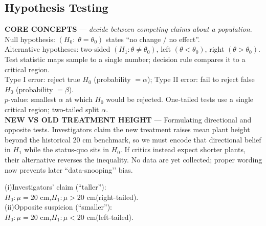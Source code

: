 \documentclass[landscape,0.4pt]{article}
\begin{document}
\begin{multicols*}{6}
\section*{\small{Hypothesis Testing}}

\textbf{\tiny{CORE CONCEPTS}} — \textit{decide between competing claims about a population}.\\
Null hypothesis: $(H_{0}:\;\theta=\theta_{0})$ states “no change / no effect”.\\
Alternative hypotheses: two-sided $(H_{1}:\theta\neq\theta_{0})$, left $(\theta<\theta_{0})$, right $(\theta>\theta_{0})$.\\
Test statistic maps sample to a single number; decision rule compares it to a critical region.\\
Type I error: reject true $H_{0}$ (probability $=\alpha$); Type II error: fail to reject false $H_{0}$ (probability $=\beta$).\\
$p$-value: smallest $\alpha$ at which $H_{0}$ would be rejected.  One-tailed tests use a single critical region; two-tailed split $\alpha$.\\[-2pt]


\textbf{\tiny{NEW VS OLD TREATMENT HEIGHT}} — Formulating directional and opposite tests.  
Investigators claim the new treatment raises mean plant height beyond the historical 20 cm benchmark, so we must encode that directional belief in $H_{1}$ while the status-quo sits in $H_{0}$.  If critics instead expect shorter plants, their alternative reverses the inequality.  No data are yet collected; proper wording now prevents later “data-snooping’’ bias.

(i)\;Investigators’ claim (“taller”):\\
\hspace*{1em}$H_{0}:\mu=20\text{ cm}$,\;\;$H_{1}:\mu>20\text{ cm}$\;(right-tailed).\\

(ii)\;Opposite suspicion (“smaller”):\\
\hspace*{1em}$H_{0}:\mu=20\text{ cm}$,\;\;$H_{1}:\mu<20\text{ cm}$\;(left-tailed).\\[-2pt]


\end{multicols*}
\end{document}
